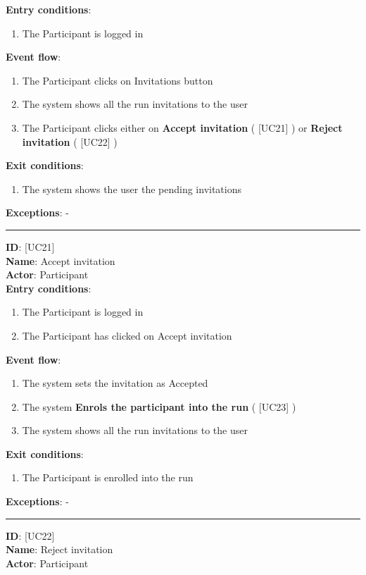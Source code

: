 \documentclass[a4paper, hidelinks, 12pt]{report}
\newcommand\usecase[1]{ [UC#1] }
\begin{document}
\begin{itemize}
		\textbf{Entry conditions}:
		\begin{enumerate}
			\item{The Participant is logged in}
		\end{enumerate}
		\textbf{Event flow}:
		\begin{enumerate}
			\item{The Participant clicks on Invitations button}
			\item{The system shows all the run invitations to the user}
			\item{The Participant clicks either on \textbf{Accept invitation} (\usecase{21}) or \textbf{Reject invitation} (\usecase{22})}
		\end{enumerate}
		\textbf{Exit conditions}:
		\begin{enumerate}
			\item{The system shows the user the pending invitations}
		\end{enumerate}
		\textbf{Exceptions}: - \\
		\rule{\linewidth}{0.4pt}
		\textbf{ID}: \usecase{21} \\
		\textbf{Name}: Accept invitation \\
		\textbf{Actor}: Participant \\
		\textbf{Entry conditions}:
		\begin{enumerate}
			\item{The Participant is logged in}
			\item{The Participant has clicked on Accept invitation}
		\end{enumerate}
		\textbf{Event flow}:
		\begin{enumerate}
			\item{The system sets the invitation as Accepted}
			\item{The system \textbf{Enrols the participant into the run} (\usecase{23})}
			\item{The system shows all the run invitations to the user}
		\end{enumerate}
		\textbf{Exit conditions}:
		\begin{enumerate}
			\item{The Participant is enrolled into the run}
		\end{enumerate}
		\textbf{Exceptions}: - \\
		\rule{\linewidth}{0.4pt}
		\textbf{ID}: \usecase{22} \\
		\textbf{Name}: Reject invitation \\
		\textbf{Actor}: Participant \\

\end{itemize}
\end{document}
